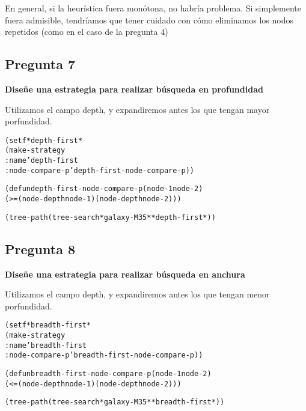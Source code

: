 En general, si la heurística fuera monótona, no habría problema. Si simplemente fuera admisible, tendríamos que tener cuidado con cómo eliminamos los nodos repetidos (como en el caso de la pregunta 4)

\subsection*{Pregunta 7}\textbf{Diseñe una estrategia para realizar búsqueda en profundidad}

Utilizamos el campo depth, y expandiremos antes los que tengan mayor porfundidad.
\begin{alltt}
(setf *depth-first*
    (make-strategy
        :name 'depth-first
        :node-compare-p 'depth-first-node-compare-p))

(defun depth-first-node-compare-p (node-1 node-2)
    (>= (node-depth node-1) (node-depth node-2)))

(tree-path (tree-search *galaxy-M35* *depth-first*))
\end{alltt}
\newpage
\subsection*{Pregunta 8}\textbf{ Diseñe una estrategia para realizar búsqueda en anchura}

Utilizamos el campo depth, y expandiremos antes los que tengan menor porfundidad.

\begin{alltt}
(setf *breadth-first*
    (make-strategy
        :name 'breadth-first
        :node-compare-p 'breadth-first-node-compare-p))

(defun breadth-first-node-compare-p (node-1 node-2)
    (<= (node-depth node-1) (node-depth node-2)))

(tree-path (tree-search *galaxy-M35* *breadth-first*))
\end{alltt}